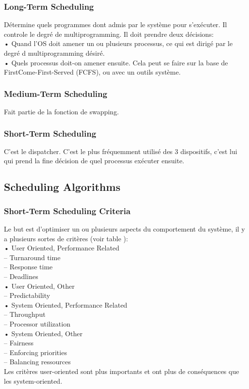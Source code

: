 \subsubsection{Long-Term Scheduling}
Détermine quels programmes dont admis par le système pour s'exécuter.
Il controle le degré de multiprogramming.
Il doit prendre deux décisions: \\
• Quand l'OS doit amener un ou plusieurs processus, ce qui est dirigé par le degré d multiprogramming désiré.\\
• Quels processus doit-on amener ensuite.
Cela peut se faire sur la base de FirstCome-First-Served (FCFS), ou avec un outils système.
\subsubsection{Medium-Term Scheduling}
Fait partie de la fonction de swapping.
\subsubsection{Short-Term Scheduling}
C'est le dispatcher.
C'est le plus fréquemment utilisé des 3 dispositifs, c'est lui qui prend la fine décision de quel processus exécuter ensuite.
\subsection{Scheduling Algorithms }
\subsubsection{Short-Term Scheduling Criteria}
Le but est d'optimiser un ou plusieurs aspects du comportement du système, il y a plusieurs sortes de critères (voir table \cite[p.~401]{stallings}):\\
• User Oriented, Performance Related\\
– Turnaround time \\
– Response time\\
– Deadlines\\
• User Oriented, Other \\
– Predictability \\
• System Oriented, Performance Related \\
– Throughput\\
– Processor utilization \\
• System Oriented, Other\\
– Fairness\\
– Enforcing priorities \\
– Balancing ressources\\
Les critères user-oriented sont plus importants et ont plus de conséquences que les system-oriented.
